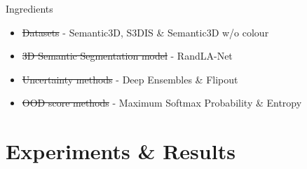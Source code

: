 \documentclass[aspectratio=169]{beamer}
\begin{document}
\begin{frame}{Ingredients}
    \begin{itemize}
        \item \st{Datasets} - Semantic3D, S3DIS \& Semantic3D w/o colour
        \item \st{3D Semantic Segmentation model} - RandLA-Net
        \item \st{Uncertainty methods} - Deep Ensembles \& Flipout
        \item \st{OOD score methods} - Maximum Softmax Probability \& Entropy
    \end{itemize}
\end{frame}
\section{Experiments \& Results}
\end{document}
